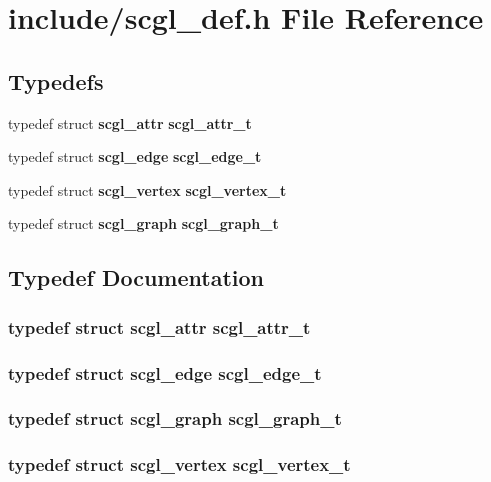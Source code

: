 \section{include/scgl\-\_\-def.h File Reference}
\label{scgl__def_8h}
\subsection*{Typedefs}
\begin{DoxyCompactItemize}
\item 
typedef struct {\bf scgl\-\_\-attr} {\bf scgl\-\_\-attr\-\_\-t}
\item 
typedef struct {\bf scgl\-\_\-edge} {\bf scgl\-\_\-edge\-\_\-t}
\item 
typedef struct {\bf scgl\-\_\-vertex} {\bf scgl\-\_\-vertex\-\_\-t}
\item 
typedef struct {\bf scgl\-\_\-graph} {\bf scgl\-\_\-graph\-\_\-t}
\end{DoxyCompactItemize}


\subsection{Typedef Documentation}
\subsubsection[{scgl\-\_\-attr\-\_\-t}]{\setlength{\rightskip}{0pt plus 5cm}typedef struct {\bf scgl\-\_\-attr} {\bf scgl\-\_\-attr\-\_\-t}}\label{scgl__def_8h_ae910e99f4d5e116275edd605c8241636}
\subsubsection[{scgl\-\_\-edge\-\_\-t}]{\setlength{\rightskip}{0pt plus 5cm}typedef struct {\bf scgl\-\_\-edge} {\bf scgl\-\_\-edge\-\_\-t}}\label{scgl__def_8h_aa35f3583b52051d01dcc7dd2918b9153}
\subsubsection[{scgl\-\_\-graph\-\_\-t}]{\setlength{\rightskip}{0pt plus 5cm}typedef struct {\bf scgl\-\_\-graph} {\bf scgl\-\_\-graph\-\_\-t}}\label{scgl__def_8h_a244dc2e2f7d5deacd9c1a6d3cfb6c131}
\subsubsection[{scgl\-\_\-vertex\-\_\-t}]{\setlength{\rightskip}{0pt plus 5cm}typedef struct {\bf scgl\-\_\-vertex} {\bf scgl\-\_\-vertex\-\_\-t}}\label{scgl__def_8h_a5516b6b61fdf7af371337b49f8ef9799}
